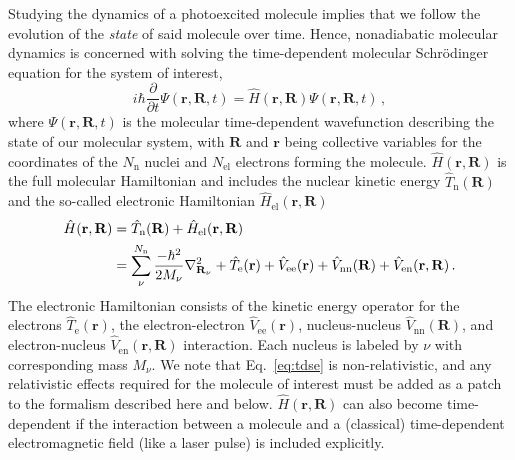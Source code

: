 \documentclass[9pt,bestpractices]{livecoms}
\begin{document}
Studying the dynamics of a photoexcited molecule implies that we follow the evolution of the \textit{state} of said molecule over time. Hence, nonadiabatic molecular dynamics is concerned with solving the time-dependent molecular Schr\"{o}dinger equation for the system of interest,
\begin{equation}
i\hbar  \frac{\partial}{\partial t} \Psi(\mathbf{r},\mathbf{R},t)=\hat{H}(\mathbf{r},\mathbf{R})\Psi(\mathbf{r},\mathbf{R},t) \, ,
\label{eq:tdse}
\end{equation}
where $\Psi(\mathbf{r},\mathbf{R},t)$ is the molecular time-dependent wavefunction describing the state of our molecular system, with $\mathbf{R}$ and $\mathbf{r}$ being collective variables for the coordinates of the $N_\text{n}$ nuclei and $N_{\text{el}}$ electrons forming the molecule. $\hat{H}(\mathbf{r},\mathbf{R})$ is the full molecular Hamiltonian and includes the nuclear kinetic energy $\hat{T}_{\text{n}}(\mathbf{R})$ and the so-called electronic Hamiltonian $\hat{H}_{\text{el}}(\mathbf{r},\mathbf{R})$
\begin{align}
\hat{H}(\mathbf{r},\mathbf{R})&=\hat{T}_{\text{n}}(\mathbf{R})+ \hat{H}_{\text{el}}(\mathbf{r},\mathbf{R})  \notag \\
&= \sum_\nu^{N_{\text{n}}}\frac{-\hbar^2}{2M_\nu}\nabla_{\mathbf{R}_\nu}^2+\hat{T}_{\text{e}}(\mathbf{r})+\hat{V}_{\text{ee}}(\mathbf{r})+\hat{V}_{\text{nn}}(\mathbf{R})+\hat{V}_{\text{en}}(\mathbf{r},\mathbf{R})  \, .
\label{eq:fullHamiltonian}
\end{align}
The electronic Hamiltonian consists of the kinetic energy operator for the electrons $\hat{T}_{\text{e}}(\mathbf{r})$, the electron-electron $\hat{V}_{\text{ee}}(\mathbf{r})$, nucleus-nucleus $\hat{V}_{\text{nn}}(\mathbf{R})$, and electron-nucleus $\hat{V}_{\text{en}}(\mathbf{r},\mathbf{R})$ interaction. Each nucleus is labeled by $\nu$ with corresponding mass $M_\nu$. We note that Eq.~\eqref{eq:tdse} is non-relativistic, and any relativistic effects required for the molecule of interest must be added as a patch to the formalism described here and below. $\hat{H}(\mathbf{r},\mathbf{R})$ can also become time-dependent if the interaction between a molecule and a (classical) time-dependent electromagnetic field (like a laser pulse) is included explicitly.\cite{tannor_book} 
 
\end{document}
